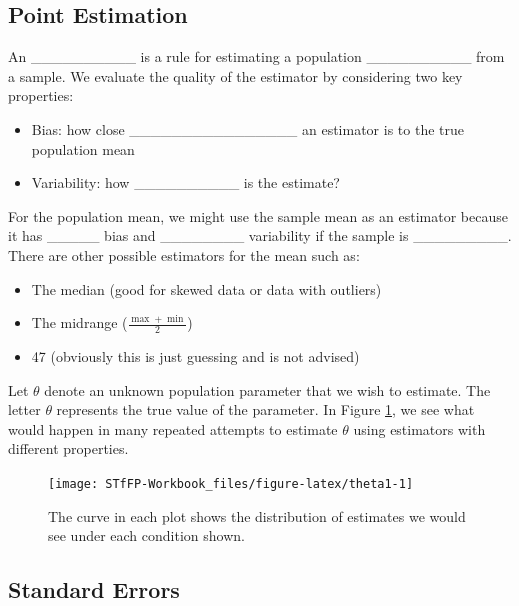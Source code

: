 \documentclass[]{book}
\providecommand{\tightlist}{%
  \setlength{\itemsep}{0pt}\setlength{\parskip}{0pt}}
\theoremstyle{definition}
\theoremstyle{definition}
\theoremstyle{remark}
\begin{document}
\subsection{Point Estimation}\label{point-estimation}

An \_\_\_\_\_\_\_\_\_\_ is a rule for estimating a population
\_\_\_\_\_\_\_\_\_\_ from a sample. We evaluate the quality of the
estimator by considering two key properties:

\begin{itemize}
\tightlist
\item
  Bias: how close \_\_\_\_\_\_\_\_\_\_\_\_\_\_\_\_ an estimator is to
  the true population mean \vspace{.1in}
\item
  Variability: how \_\_\_\_\_\_\_\_\_\_ is the estimate?
\end{itemize}

For the population mean, we might use the sample mean as an estimator
because it has \_\_\_\_\_ bias and \_\_\_\_\_\_\_\_ variability if the
sample is \_\_\_\_\_\_\_\_\_. There are other possible estimators for
the mean such as:

\begin{itemize}
\tightlist
\item
  The median (good for skewed data or data with outliers)
\item
  The midrange (\(\frac{\max + \min}{2}\))
\item
  47 (obviously this is just guessing and is not advised)
\end{itemize}

Let \(\theta\) denote an unknown population parameter that we wish to
estimate. The letter \(\theta\) represents the true value of the
parameter. In Figure \ref{fig:theta1}, we see what would happen in many
repeated attempts to estimate \(\theta\) using estimators with different
properties.

\begin{figure}[h]

{\centering \texttt{[image: STfFP-Workbook\_files/figure-latex/theta1-1]} 

}

\caption{The curve in each plot shows the distribution of estimates we would see under each condition shown.}\label{fig:theta1}
\end{figure}

\subsection{Standard Errors}\label{standard-errors}
\end{document}
